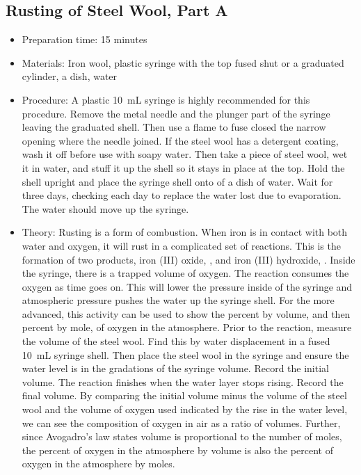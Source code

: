 \subsection{Rusting of Steel Wool, Part A}
\begin{itemize}
\item{Preparation time: 15 minutes}
\item{Materials: Iron wool, plastic syringe with the top fused shut or a graduated cylinder, a dish, water}
\item{Procedure: A plastic 10~mL syringe is highly recommended for this procedure. Remove the metal needle and the plunger part of the syringe leaving the graduated shell. Then use a flame to fuse closed the narrow opening where the needle joined. If the steel wool has a detergent coating, wash it off before use with soapy water. Then take a piece of steel wool, wet it in water, and stuff it up the shell so it stays in place at the top. Hold the shell upright and place the syringe shell onto of a dish of water. Wait for three days, checking each day to replace the water lost due to evaporation. The water should move up the syringe.}
\item{Theory: Rusting is a form of combustion. When iron is in contact with both water and oxygen, it will rust in a complicated set of reactions. This is the formation of two products, iron (III) oxide, , and iron (III) hydroxide, . Inside the syringe, there is a trapped volume of oxygen. The reaction consumes the oxygen as time goes on. This will lower the pressure inside of the syringe and atmospheric pressure pushes the water up the syringe shell. For the more advanced, this activity can be used to show the percent by volume, and then percent by mole, of oxygen in the atmosphere. Prior to the reaction, measure the volume of the steel wool. Find this by water displacement in a fused 10~mL syringe shell. Then place the steel wool in the syringe and ensure the water level is in the gradations of the syringe volume. Record the initial volume. The reaction finishes when the water layer stops rising. Record the final volume. By comparing the initial volume minus the volume of the steel wool and the volume of oxygen used indicated by the rise in the water level, we can see the composition of oxygen in air as a ratio of volumes. Further, since Avogadro’s law states volume is proportional to the number of moles, the percent of oxygen in the atmosphere by volume is also the percent of oxygen in the atmosphere by moles.}
\end{itemize}

